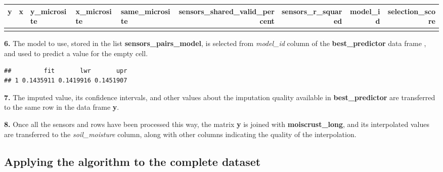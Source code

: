 \documentclass[]{article}
\newenvironment{Shaded}{\begin{snugshade}}{\end{snugshade}}
\newcommand{\DataTypeTok}[1]{\textcolor[rgb]{0.13,0.29,0.53}{#1}}
\newcommand{\KeywordTok}[1]{\textcolor[rgb]{0.13,0.29,0.53}{\textbf{#1}}}
\newcommand{\NormalTok}[1]{#1}
\newcommand{\OperatorTok}[1]{\textcolor[rgb]{0.81,0.36,0.00}{\textbf{#1}}}
\newcommand{\OtherTok}[1]{\textcolor[rgb]{0.56,0.35,0.01}{#1}}
\newcommand{\StringTok}[1]{\textcolor[rgb]{0.31,0.60,0.02}{#1}}
\begin{document}
\begin{table}[H]
\centering
\begin{tabular}[t]{l|l|l|l|l|r|r|r|r}
\hline
y & x & y\_microsite & x\_microsite & same\_microsite & sensors\_shared\_valid\_percent & sensors\_r\_squared & model\_id & selection\_score\\
\hline
\cellcolor{gray!6}{stipa5063} & \cellcolor{gray!6}{stipa5094} & \cellcolor{gray!6}{stipa} & \cellcolor{gray!6}{stipa} & \cellcolor{gray!6}{TRUE} & \cellcolor{gray!6}{48.28543} & \cellcolor{gray!6}{0.5162195} & \cellcolor{gray!6}{146} & \cellcolor{gray!6}{199.9074}\\
\hline
\end{tabular}
\end{table}

\textbf{6.} The model to use, stored in the list
\textbf{sensors\_pairs\_model}, is selected from \emph{model\_id} column
of the \textbf{best\_predictor} data frame , and used to predict a value
for the empty cell.

\begin{Shaded}
\end{Shaded}

\begin{verbatim}
##         fit       lwr       upr
## 1 0.1435911 0.1419916 0.1451907
\end{verbatim}

\textbf{7.} The imputed value, its confidence intervals, and other
values about the imputation quality available in
\textbf{best\_predictor} are transferred to the same row in the data
frame \textbf{y}.

\textbf{8.} Once all the sensors and rows have been processed this way,
the matrix \textbf{y} is joined with \textbf{moiscrust\_long}, and its
interpolated values are transferred to the \emph{soil\_moisture} column,
along with other columns indicating the quality of the interpolation.

\hypertarget{applying-the-algorithm-to-the-complete-dataset}{%
\subsection{Applying the algorithm to the complete
dataset}\label{applying-the-algorithm-to-the-complete-dataset}}
\end{document}

